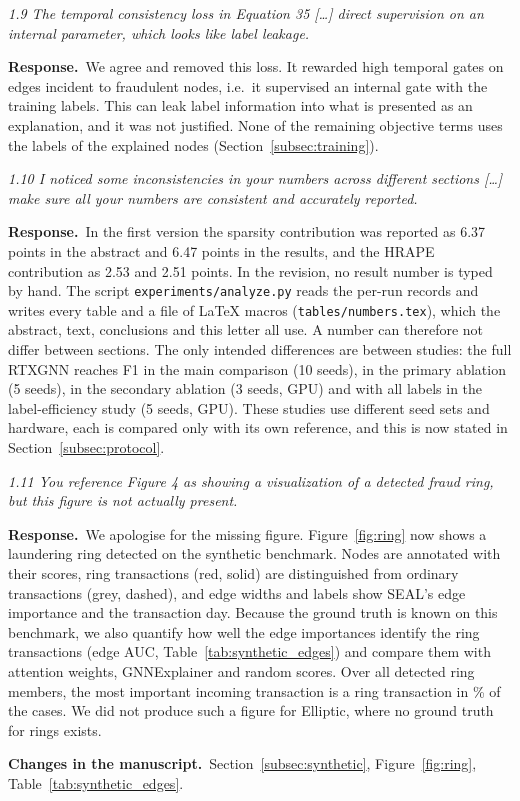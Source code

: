 \documentclass[11pt]{article}
\newenvironment{comment}{\par\medskip\noindent\begin{minipage}{\linewidth}\itshape\color{black!75}}{\end{minipage}\par\smallskip}
\newcommand{\resp}{\par\noindent\textbf{Response.}\ }
\newcommand{\change}{\par\noindent\textbf{Changes in the manuscript.}\ }
\begin{document}
\begin{comment}
1.9 The temporal consistency loss in Equation 35 [\dots] direct supervision on an internal parameter, which looks like label leakage.
\end{comment}
\resp We agree and removed this loss. It rewarded high temporal gates on edges incident to fraudulent nodes, i.e.\ it supervised an internal gate with the training labels. This can leak label information into what is presented as an explanation, and it was not justified. None of the remaining objective terms uses the labels of the explained nodes (Section~\ref{subsec:training}).

\begin{comment}
1.10 I noticed some inconsistencies in your numbers across different sections [\dots] make sure all your numbers are consistent and accurately reported.
\end{comment}
\resp In the first version the sparsity contribution was reported as 6.37 points in the abstract and 6.47 points in the results, and the HRAPE contribution as 2.53 and 2.51 points. In the revision, no result number is typed by hand. The script \texttt{experiments/analyze.py} reads the per-run records and writes every table and a file of LaTeX macros (\texttt{tables/numbers.tex}), which the abstract, text, conclusions and this letter all use. A number can therefore not differ between sections. The only intended differences are between studies: the full RTXGNN reaches F1 \rtxFone{} in the main comparison (10 seeds), \ablfullFone{} in the primary ablation (5 seeds), \ablGfullFone{} in the secondary ablation (3 seeds, GPU) and \lertxgnnOneZeroZero{} with all labels in the label-efficiency study (5 seeds, GPU). These studies use different seed sets and hardware, each is compared only with its own reference, and this is now stated in Section~\ref{subsec:protocol}.

\begin{comment}
1.11 You reference Figure 4 as showing a visualization of a detected fraud ring, but this figure is not actually present.
\end{comment}
\resp We apologise for the missing figure. Figure~\ref{fig:ring} now shows a laundering ring detected on the synthetic benchmark. Nodes are annotated with their scores, ring transactions (red, solid) are distinguished from ordinary transactions (grey, dashed), and edge widths and labels show SEAL's edge importance and the transaction day. Because the ground truth is known on this benchmark, we also quantify how well the edge importances identify the ring transactions (edge AUC, Table~\ref{tab:synthetic_edges}) and compare them with attention weights, GNNExplainer and random scores. Over all detected ring members, the most important incoming transaction is a ring transaction in \ringHitPct\% of the cases. We did not produce such a figure for Elliptic, where no ground truth for rings exists.
\change Section~\ref{subsec:synthetic}, Figure~\ref{fig:ring}, Table~\ref{tab:synthetic_edges}.
\end{document}
